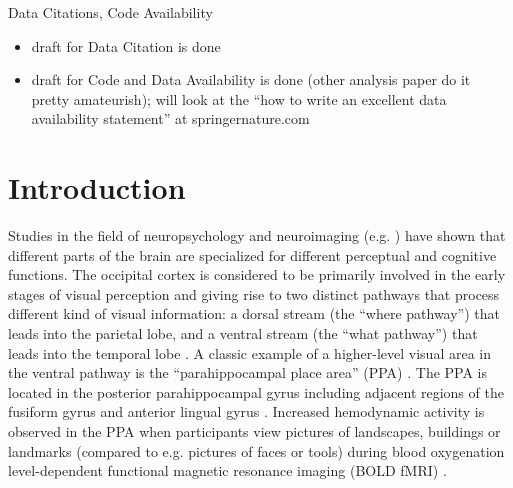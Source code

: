 \documentclass[english]{article}
\begin{document}
\noindent Data Citations, Code Availability
\begin{itemize}
    \item draft for Data Citation is done
    \item draft for Code and Data Availability is done (other analysis paper do
        it pretty amateurish); will look at the ``how to write an excellent
        data availability statement'' at springernature.com
\end{itemize}

\pagebreak[4]


\section{Introduction}


Studies in the field of neuropsychology and neuroimaging (e.g.
\citep{penfield1950cerebral, fox1984noninvasive}) have shown that different
parts of the brain are specialized for different perceptual and cognitive
functions.
The occipital cortex is considered to be primarily involved in the early stages
of visual perception and giving rise to two distinct pathways that process
different kind of visual information:
a dorsal stream (the ``where pathway'') that leads into the parietal lobe, and a
ventral stream (the ``what pathway'') that leads into the temporal lobe
\citep{goodale1992separate, mishkin1982contribution}.
A classic example of a higher-level visual area in the ventral pathway is the
``parahippocampal place area'' (PPA) \citep{epstein1998ppa,
epstein1999parahippocampal}.
The PPA is located in the posterior parahippocampal gyrus including adjacent
regions of the fusiform gyrus and anterior lingual gyrus
\citep{epstein2008parahippocampal}.
Increased hemodynamic activity is observed in the PPA when participants view
pictures of landscapes, buildings or landmarks (compared to e.g. pictures of
faces or tools) during blood oxygenation level-dependent functional magnetic
resonance imaging (BOLD fMRI) \citep{aguirre1998area, epstein2014neural,
epstein1998ppa, troiani2012object}.
\end{document}
